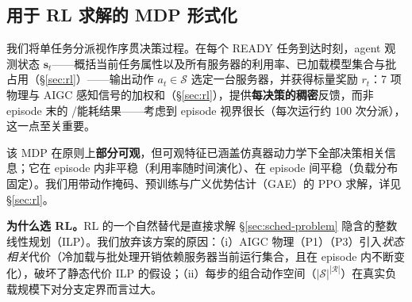\subsection{用于 RL 求解的 MDP 形式化}
\label{sec:mdp}

我们将单任务分派视作序贯决策过程。在每个 READY 任务到达时刻，agent 观测状态 $\mathbf{s}_t$——概括当前任务属性以及所有服务器的利用率、已加载模型集合与批占用（\S\ref{sec:rl}）——输出动作 $a_t \in \mathcal{S}$ 选定一台服务器，并获得标量奖励 $r_t$：7 项物理与 AIGC 感知信号的加权和（\S\ref{sec:rl}），提供\textbf{每决策的稠密}反馈，而非 episode 末的 \slo{}/能耗结果——考虑到 episode 视界很长（每次运行约 100 次分派），这一点至关重要。

该 MDP 在原则上\textbf{部分可观}，但可观特征已涵盖仿真器动力学下全部决策相关信息；它在 episode 内非平稳（利用率随时间演化）、在 episode 间平稳（负载分布固定）。我们用带动作掩码、预训练与广义优势估计（GAE）的 PPO 求解，详见 \S\ref{sec:rl}。

\textbf{为什么选 RL。}RL 的一个自然替代是直接求解 \S\ref{sec:sched-problem} 隐含的整数线性规划（ILP）。我们放弃该方案的原因：（i）AIGC 物理（P1）（P3）引入\emph{状态相关}代价（冷加载与批处理开销依赖服务器当前运行集合，且在 episode 内不断变化），破坏了静态代价 ILP 的假设；（ii）每步的组合动作空间（$|\mathcal{S}|^{|\mathcal{R}|}$）在真实负载规模下对分支定界而言过大。
